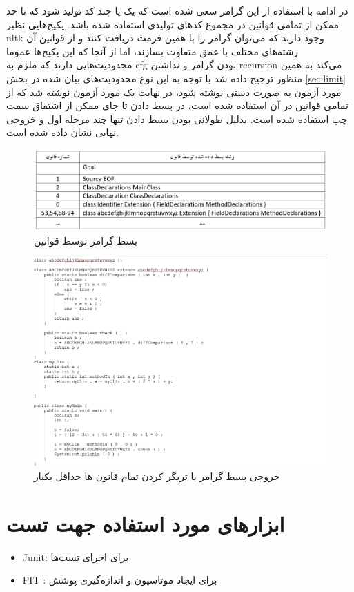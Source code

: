 در ادامه با استفاده از این گرامر سعی شده است که یک یا چند کد تولید شود که تا حد ممکن از تمامی قوانین در مجموع کدهای تولیدی استفاده شده باشد. پکیج‌هایی نظیر nltk وجود دارند که می‌توان گرامر را با همین فرمت دریافت کنند و از قوانین آن رشته‌های مختلف با عمق متفاوت بسازند، اما از آنجا که این پکیج‌ها عموما محدودیت‌هایی دارند که ملزم به cfg بودن گرامر و نداشتن recursion می‌کند به همین منظور ترجیح داده شد با توجه به این نوع محدودیت‌های بیان شده در بخش \ref{sec:limit} مورد آزمون به صورت دستی نوشته شود، در نهایت یک مورد آزمون نوشته شد که از تمامی قوانین در آن استفاده شده است، در بسط دادن تا جای ممکن از اشتقاق سمت چپ استفاده شده است. بدلیل طولانی بودن بسط دادن تنها چند مرحله اول و خروجی نهایی نشان داده شده است.


\begin{figure}[ht]
\centering
\includegraphics[scale=0.6]{derivation.PNG}
\caption{بسط گرامر توسط قوانین}
\label{fig:3}
\end{figure}

\begin{figure}[ht]
\centering
\includegraphics[scale=0.6]{output_test.PNG}
\caption{خروجی بسط گرامر با تریگر کردن تمام قانون ها حداقل یکبار}
\label{fig:4}
\end{figure}

\section{ابزارهای مورد استفاده جهت تست}
\begin{itemize}
\item Junit: برای اجرای تست‌ها 
\item PIT : برای ایجاد موتاسیون و اندازه‌گیری پوشش
\end{itemize}


